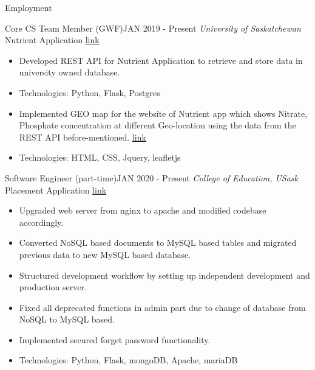 \documentclass[]{mcdowellcv}
\begin{document}
	\begin{cvsection}{Employment}
	
    		\begin{cvsubsection}{Core CS Team Member (GWF)}{}{JAN 2019 - Present}
    		\emph{University of Saskatchewan}\\
    		Nutrient Application \href{https://gwf.usask.ca/projects-facilities/nutrient-app.php#Overview}{ link }
    	    \begin{itemize}
    	        \item Developed REST API for 
    	        Nutrient Application to retrieve and store data in university owned database. 
    	        \item Technologies: Python, Flask, Postgres
    	        \item Implemented GEO map for the website of Nutrient app which shows Nitrate, Phosphate concentration at different Geo-location using the data from the REST API before-mentioned. \href{https://gwf.usask.ca/projects-facilities/nutrient-app.php#ViewYourMeasurements}{link}
    	        \item Technologies: HTML, CSS, Jquery, leafletjs
    	        
    	    \end{itemize}
    	
        \end{cvsubsection}
        
        \begin{cvsubsection}{Software Engineer (part-time)}{}{JAN 2020 - Present}
	    \emph{College of Education, USask}\\
	    Placement Application \href{https://placement.usask.ca}{link}
    	    \begin{itemize}
    	        \item Upgraded web server from nginx to apache and modified codebase accordingly.
    	        \item Converted NoSQL based documents to MySQL based tables and migrated previous data to new MySQL based database.
    	        \item Structured development workflow by setting up independent development and production server.
    	        \item Fixed all deprecated functions in admin part due to change of database from NoSQL to MySQL based.
    	        \item Implemented secured forget password functionality.
    	        \item Technologies: Python, Flask, mongoDB, Apache, mariaDB
    	         

\end{itemize}
\end{cvsubsection}
\end{cvsection}
\end{document}
